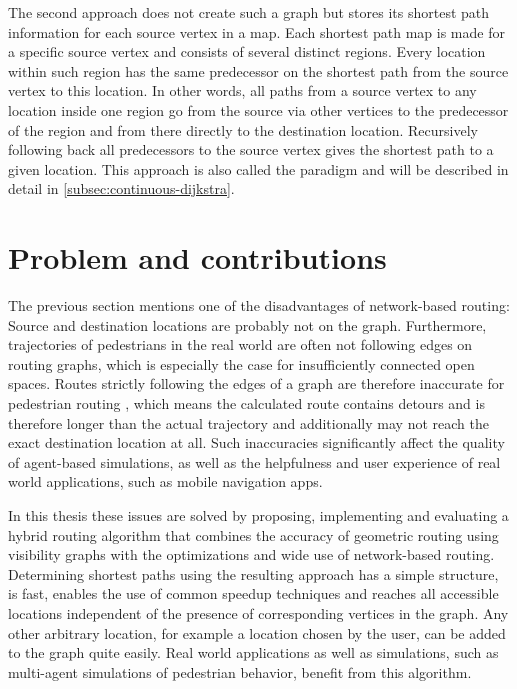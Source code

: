 	The second approach does not create such a graph but stores its shortest path information for each source vertex in a map.
	Each shortest path map is made for a specific source vertex and consists of several distinct regions.
	Every location within such region has the same predecessor on the shortest path from the source vertex to this location.
	In other words, all paths from a source vertex to any location inside one region go from the source via other vertices to the predecessor of the region and from there directly to the destination location.
	Recursively following back all predecessors to the source vertex gives the shortest path to a given location.
	This approach is also called the  paradigm and will be described in detail in \cref{subsec:continuous-dijkstra}.
	
\section{Problem and contributions}

	The previous section mentions one of the disadvantages of network-based routing:
	Source and destination locations are probably not on the graph.
	Furthermore, trajectories of pedestrians in the real world are often not following edges on routing graphs, which is especially the case for insufficiently connected open spaces.
	Routes strictly following the edges of a graph are therefore inaccurate for pedestrian routing \cite{graser-osm-open-spaces}, which means the calculated route contains detours and is therefore longer than the actual trajectory and additionally may not reach the exact destination location at all.
	Such inaccuracies significantly affect the quality of agent-based simulations, as well as the helpfulness and user experience of real world applications, such as mobile navigation apps.

	In this thesis these issues are solved by proposing, implementing and evaluating a hybrid routing algorithm that combines the accuracy of geometric routing using visibility graphs with the optimizations and wide use of network-based routing.
	Determining shortest paths using the resulting approach has a simple structure, is fast, enables the use of common speedup techniques and reaches all accessible locations independent of the presence of corresponding vertices in the graph.
	Any other arbitrary location, for example a location chosen by the user, can be added to the graph quite easily.
	Real world applications as well as simulations, such as multi-agent simulations of pedestrian behavior, benefit from this algorithm.
	
